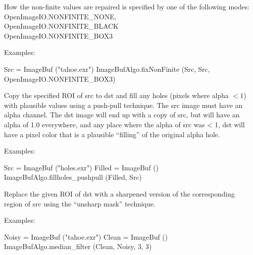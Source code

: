 How the non-finite values are repaired is specified by one of the
following modes: \\
{\cf OpenImageIO.NONFINITE_NONE}, \\
{\cf OpenImageIO.NONFINITE_BLACK} \\ 
{\cf OpenImageIO.NONFINITE_BOX3}

\smallskip
\noindent Examples:
\begin{code}
    Src = ImageBuf ("tahoe.exr")
    ImageBufAlgo.fixNonFinite (Src, Src, OpenImageIO.NONFINITE_BOX3)
\end{code}
\apiend


 
Copy the specified ROI of {\cf src} to {\cf dst} and fill any 
holes (pixels where alpha $< 1$) with plausible values using a push-pull
technique.  The {\cf src} image must have
an alpha channel.  The dst image will end up with a copy of src, but
will have an alpha of 1.0 everywhere, and any place where the alpha
of src was < 1, dst will have a pixel color that is a plausible
``filling'' of the original alpha hole.

\smallskip
\noindent Examples:
\begin{code}
    Src = ImageBuf ("holes.exr")
    Filled = ImageBuf ()
    ImageBufAlgo.fillholes_pushpull (Filled, Src)
\end{code}
\apiend


 


Replace the given ROI of {\cf dst} with a sharpened version of the
corresponding region of {\cf src} using the ``unsharp mask'' technique.

\smallskip
\noindent Examples:
\begin{code}
    Noisy = ImageBuf ("tahoe.exr")
    Clean = ImageBuf ()
    ImageBufAlgo.median_filter (Clean, Noisy, 3, 3)
\end{code}
\apiend


 

